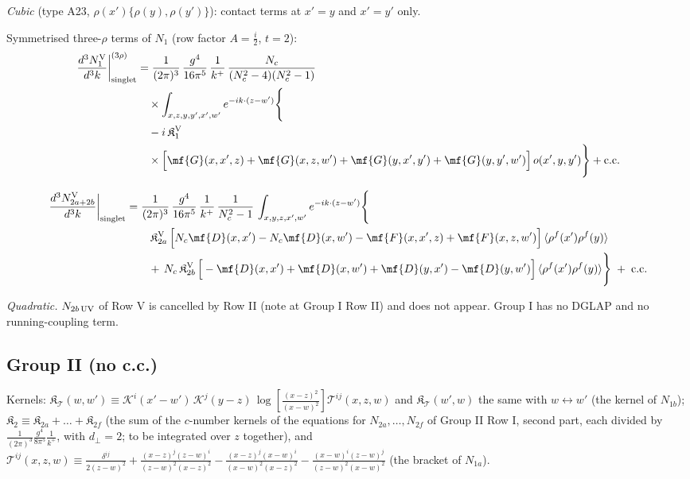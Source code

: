 {\emph{Cubic} (type A23, $\rho(x')\{\rho(y),\rho(y')\}$): contact terms at $x'=y$ and $x'=y'$ only.

 Symmetrised three-$\rho$ terms of $N_{1}$ (row factor $A=\frac{i}{2}$, $t=2$):
\begin{align}
\frac{d^{3}N_{1}^{\rm V}}{d^{3}k}\bigg|^{(3\rho)}_{\rm singlet}&=\frac{1}{(2\pi)^{3}}\,\frac{g^{4}}{16\pi^{5}}\,\frac{1}{k^{+}}\,\frac{N_{c}}{(N_{c}^{2}-4)(N_{c}^{2}-1)}\notag\\
&\quad\times\int_{x,z,y,y',x',w'}e^{-ik\cdot(z-w')}\Bigg\{\notag\\
&\quad-i\,\mathfrak{K}^{\rm V}_{1}\notag\\
&\quad\times\Big[\mf{G}(x,x',z)+\mf{G}(x,z,w')+\mf{G}(y,x',y')+\mf{G}(y,y',w')\Big]\,o(x',y,y')\Bigg\}+{\rm c.c.}\label{eq:s-o-I-V-1}
\end{align}

\begin{align}
\frac{d^{3}N_{2a+2b}^{\rm V}}{d^{3}k}\bigg|_{\rm singlet}&=\frac{1}{(2\pi)^{3}}\,\frac{g^{4}}{16\pi^{5}}\,\frac{1}{k^{+}}\,\frac{1}{N_{c}^{2}-1}\,\int_{x,y,z,x',w'}e^{-ik\cdot(z-w')}\Bigg\{\notag\\
&\qquad \,\mathfrak{K}^{\rm V}_{2a}\,\Big[N_{c}\mf{D}(x,x')-N_{c}\mf{D}(x,w')-\mf{F}(x,x',z)+\mf{F}(x,z,w')\Big]\,\langle\rho^{f}(x')\rho^{f}(y)\rangle\notag\\
&\qquad +\,N_{c}\,\mathfrak{K}^{\rm V}_{2b}\,\Big[-\mf{D}(x,x')+\mf{D}(x,w')+\mf{D}(y,x')-\mf{D}(y,w')\Big]\,\langle\rho^{f}(x')\rho^{f}(y)\rangle\Bigg\}\;+\;{\rm c.c.}\label{eq:s-I-V-2}
\end{align}

\emph{Quadratic.} $N_{2b\,\rm UV}$ of Row V is cancelled by Row II (note at Group I Row II) and does not appear. Group I has no DGLAP and no running-coupling term.

\subsection{Group II (no c.c.)}
\noindent Kernels: $\mathfrak{K}_{\mathcal{T}}(w,w')\equiv\mathcal{K}^{i}(x'-w')\,\mathcal{K}^{j}(y-z)\,\log\left[\frac{(x-z)^{2}}{(x-w)^{2}}\right]\mathcal{T}^{ij}(x,z,w)$ and $\mathfrak{K}_{\mathcal{T}}(w',w)$ the same with $w\leftrightarrow w'$ (the kernel of $N_{1b}$); $\mathfrak{K}_{2}\equiv\mathfrak{K}_{2a}+\dots+\mathfrak{K}_{2f}$ (the sum of the $c$-number kernels of the equations for $N_{2a},\dots,N_{2f}$ of Group II Row I, second part, each divided by $\frac{1}{(2\pi)^{3}}\frac{g^{4}}{8\pi^{5}}\frac{1}{k^{+}}$, with $d_{\perp}=2$; to be integrated over $z$ together), and $\mathcal{T}^{ij}(x,z,w)\equiv\frac{\delta^{ij}}{2(z-w)^{2}}+\frac{(x-z)^{j}(z-w)^{i}}{(z-w)^{2}(x-z)^{2}}-\frac{(x-z)^{j}(x-w)^{i}}{(x-w)^{2}(x-z)^{2}}-\frac{(x-w)^{i}(z-w)^{j}}{(z-w)^{2}(x-w)^{2}}$ (the bracket of $N_{1a}$).
}
